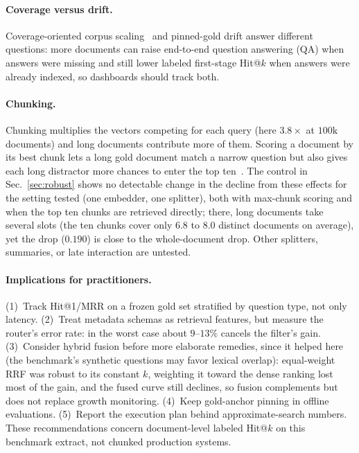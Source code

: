 \documentclass{ieeeaccess}
\makeatletter
\DeclareRobustCommand{\_}{\ifmmode\nfss@text{\textunderscore}\else\textunderscore\allowbreak\fi}
\makeatother
\begin{document}
\paragraph{Coverage versus drift.}
Coverage-oriented corpus scaling~\cite{lessllm2025docs} and pinned-gold drift answer different questions: more documents can raise end-to-end question answering (QA) when answers were missing and still lower labeled first-stage Hit@$k$ when answers were already indexed, so dashboards should track both.

\paragraph{Chunking.}
Chunking multiplies the vectors competing for each query (here $3.8\times$ at $100\text{k}$ documents) and long documents contribute more of them. Scoring a document by its best chunk lets a long gold document match a narrow question but also gives each long distractor more chances to enter the top ten~\cite{chen2024densex}. The control in Sec.~\ref{sec:robust} shows no detectable change in the decline from these effects for the setting tested (one embedder, one splitter), both with max-chunk scoring and when the top ten chunks are retrieved directly; there, long documents take several slots (the ten chunks cover only $6.8$ to $8.0$ distinct documents on average), yet the drop ($0.190$) is close to the whole-document drop. Other splitters, summaries, or late interaction are untested.

\paragraph{Implications for practitioners.}
(1)~Track Hit@1/MRR on a frozen gold set stratified by question type, not only latency. (2)~Treat metadata schemas as retrieval features, but measure the router's error rate: in the worst case about $9$--$13\%$ cancels the filter's gain. (3)~Consider hybrid fusion before more elaborate remedies, since it helped here (the benchmark's synthetic questions may favor lexical overlap): equal-weight RRF was robust to its constant $k$, weighting it toward the dense ranking lost most of the gain, and the fused curve still declines, so fusion complements but does not replace growth monitoring. (4)~Keep gold-anchor pinning in offline evaluations. (5)~Report the execution plan behind approximate-search numbers. These recommendations concern document-level labeled Hit@$k$ on this benchmark extract, not chunked production systems.
\end{document}
